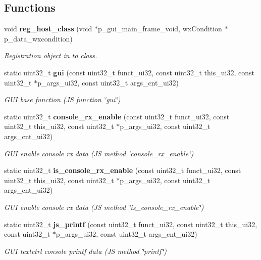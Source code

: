 \subsection*{Functions}
\begin{DoxyCompactItemize}
\item 
void \textbf{ reg\+\_\+host\+\_\+class} (void $\ast$p\+\_\+gui\+\_\+main\+\_\+frame\+\_\+void, wx\+Condition $\ast$p\+\_\+data\+\_\+wxcondition)
\begin{DoxyCompactList}\small\item\em Registration object in to class. \end{DoxyCompactList}\item 
static uint32\+\_\+t \textbf{ gui} (const uint32\+\_\+t funct\+\_\+ui32, const uint32\+\_\+t this\+\_\+ui32, const uint32\+\_\+t $\ast$p\+\_\+args\+\_\+ui32, const uint32\+\_\+t args\+\_\+cnt\+\_\+ui32)
\begin{DoxyCompactList}\small\item\em G\+UI base function (JS function \char`\"{}gui\char`\"{}) \end{DoxyCompactList}\item 
static uint32\+\_\+t \textbf{ console\+\_\+rx\+\_\+enable} (const uint32\+\_\+t funct\+\_\+ui32, const uint32\+\_\+t this\+\_\+ui32, const uint32\+\_\+t $\ast$p\+\_\+args\+\_\+ui32, const uint32\+\_\+t args\+\_\+cnt\+\_\+ui32)
\begin{DoxyCompactList}\small\item\em G\+UI enable console rx data (JS method \char`\"{}console\+\_\+rx\+\_\+enable\char`\"{}) \end{DoxyCompactList}\item 
static uint32\+\_\+t \textbf{ is\+\_\+console\+\_\+rx\+\_\+enable} (const uint32\+\_\+t funct\+\_\+ui32, const uint32\+\_\+t this\+\_\+ui32, const uint32\+\_\+t $\ast$p\+\_\+args\+\_\+ui32, const uint32\+\_\+t args\+\_\+cnt\+\_\+ui32)
\begin{DoxyCompactList}\small\item\em G\+UI enable console rx data (JS method \char`\"{}is\+\_\+console\+\_\+rx\+\_\+enable\char`\"{}) \end{DoxyCompactList}\item 
static uint32\+\_\+t \textbf{ js\+\_\+printf} (const uint32\+\_\+t funct\+\_\+ui32, const uint32\+\_\+t this\+\_\+ui32, const uint32\+\_\+t $\ast$p\+\_\+args\+\_\+ui32, const uint32\+\_\+t args\+\_\+cnt\+\_\+ui32)
\begin{DoxyCompactList}\small\item\em G\+UI textctrl console printf data (JS method \char`\"{}printf\char`\"{}) \end{DoxyCompactList}\item 

\end{DoxyCompactItemize}
